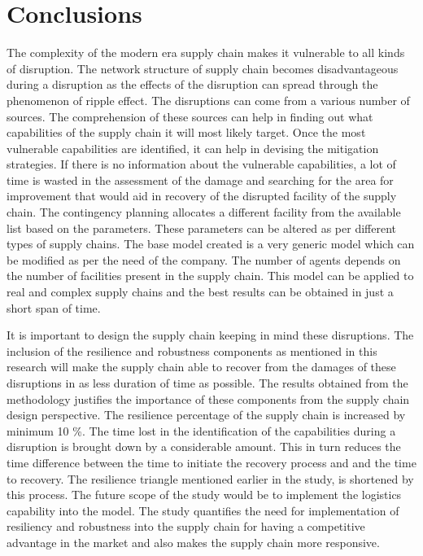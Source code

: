 \chapter{Conclusions} \label{ch:conclusion}

The complexity of the modern era supply chain makes it vulnerable to all kinds of disruption. The network structure of supply chain becomes disadvantageous during a disruption as the effects of the disruption can spread through the phenomenon of ripple effect. The disruptions can come from a various number of sources. The comprehension of these sources can help in finding out what capabilities of the supply chain it will most likely target. Once the most vulnerable capabilities are identified, it can help in devising the mitigation strategies. If there is no information about the vulnerable capabilities, a lot of time is wasted in the assessment of the damage and searching for the area for improvement that would aid in recovery of the disrupted facility of the supply chain. The contingency planning allocates a different facility from the available list based on the parameters. These parameters can be altered as per different types of supply chains. The base model created is a very generic model which can be modified as per the need of the company. The number of agents depends on the number of facilities present in the supply chain. This model can be applied to real and complex supply chains and the best results can be obtained in just a short span of time. 

It is important to design the supply chain keeping in mind these disruptions. The inclusion of the resilience and robustness components as mentioned in this research will make the supply chain able to recover from the damages of these disruptions in as less duration of time as possible. The results obtained from the methodology justifies the importance of these components from the supply chain design perspective. The resilience percentage of the supply chain is increased by minimum 10 \%. The time lost in the identification of the capabilities during a disruption is brought down by a considerable amount. This in turn reduces the time difference between the time to initiate the recovery process and and the time to recovery. The resilience triangle mentioned earlier in the study, is shortened by this process. The future scope of the study would be to implement the logistics capability into the model. The study quantifies the need for implementation of resiliency and robustness into the supply chain for having a competitive advantage in the market and also makes the supply chain more responsive. 




